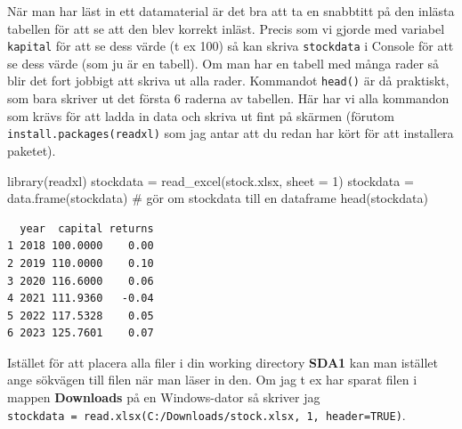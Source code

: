 \documentclass[
  letterpaper,
  DIV=11,
  numbers=noendperiod,
  oneside]{scrartcl}
\newenvironment{Shaded}{\begin{snugshade}}{\end{snugshade}}
\newcommand{\AttributeTok}[1]{\textcolor[rgb]{0.40,0.45,0.13}{#1}}
\newcommand{\CommentTok}[1]{\textcolor[rgb]{0.37,0.37,0.37}{#1}}
\newcommand{\DecValTok}[1]{\textcolor[rgb]{0.68,0.00,0.00}{#1}}
\newcommand{\FunctionTok}[1]{\textcolor[rgb]{0.28,0.35,0.67}{#1}}
\newcommand{\NormalTok}[1]{\textcolor[rgb]{0.00,0.23,0.31}{#1}}
\newcommand{\OtherTok}[1]{\textcolor[rgb]{0.00,0.23,0.31}{#1}}
\newcommand{\StringTok}[1]{\textcolor[rgb]{0.13,0.47,0.30}{#1}}
\begin{document}
När man har läst in ett datamaterial är det bra att ta en snabbtitt på
den inlästa tabellen för att se att den blev korrekt inläst. Precis som
vi gjorde med variabel \texttt{kapital} för att se dess värde (t ex 100)
så kan skriva \texttt{stockdata} i Console för att se dess värde (som ju
är en tabell). Om man har en tabell med många rader så blir det fort
jobbigt att skriva ut alla rader. Kommandot \texttt{head()} är då
praktiskt, som bara skriver ut det första 6 raderna av tabellen. Här har
vi alla kommandon som krävs för att ladda in data och skriva ut fint på
skärmen (förutom
\texttt{install.packages(\textquotesingle{}readxl\textquotesingle{})}
som jag antar att du redan har kört för att installera paketet).

\begin{Shaded}
\begin{Highlighting}[]
\FunctionTok{library}\NormalTok{(readxl)}
\NormalTok{stockdata }\OtherTok{=} \FunctionTok{read\_excel}\NormalTok{(}\StringTok{\textquotesingle{}stock.xlsx\textquotesingle{}}\NormalTok{, }\AttributeTok{sheet =} \DecValTok{1}\NormalTok{)}
\NormalTok{stockdata }\OtherTok{=} \FunctionTok{data.frame}\NormalTok{(stockdata) }\CommentTok{\# gör om stockdata till en dataframe}
\FunctionTok{head}\NormalTok{(stockdata)}
\end{Highlighting}
\end{Shaded}

\begin{verbatim}
  year  capital returns
1 2018 100.0000    0.00
2 2019 110.0000    0.10
3 2020 116.6000    0.06
4 2021 111.9360   -0.04
5 2022 117.5328    0.05
6 2023 125.7601    0.07
\end{verbatim}

\begin{tcolorbox}[enhanced jigsaw, left=2mm, opacityback=0, toprule=.15mm, titlerule=0mm, colframe=quarto-callout-tip-color-frame, rightrule=.15mm, colbacktitle=quarto-callout-tip-color!10!white, toptitle=1mm, leftrule=.75mm, coltitle=black, title=\textcolor{quarto-callout-tip-color}{\faLightbulb}\hspace{0.5em}{Tip}, breakable, bottomtitle=1mm, arc=.35mm, colback=white, bottomrule=.15mm, opacitybacktitle=0.6]

Istället för att placera alla filer i din working directory
\textbf{SDA1} kan man istället ange sökvägen till filen när man läser in
den. Om jag t ex har sparat filen i mappen \textbf{Downloads} på en
Windows-dator så skriver jag \textbf{\hfill\break
}\texttt{stockdata\ =\ read.xlsx(\textquotesingle{}C:/Downloads/stock.xlsx\textquotesingle{},\ 1,\ header=TRUE)}.

\end{tcolorbox}
\end{document}
